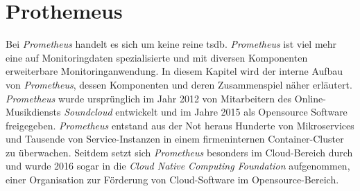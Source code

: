 \documentclass[titlepage]{report}
\begin{document}
\section*{Prothemeus}
Bei \emph{Prometheus} handelt es sich um keine reine \gls{tsdb}.
\emph{Prometheus} ist viel mehr eine auf Monitoringdaten spezialisierte
und mit diversen Komponenten erweiterbare Monitoringanwendung. In diesem
Kapitel wird der interne Aufbau von \emph{Prometheus}, dessen
Komponenten und deren Zusammenspiel näher erläutert. \emph{Prometheus}
wurde ursprünglich im Jahr 2012 von Mitarbeitern des Online-Musikdiensts
\emph{Soundcloud} entwickelt\cite{PROMETHEUS_OVERVIEW} und im Jahre 2015
als Opensource Software freigegeben. \emph{Prometheus} entstand aus der
Not heraus Hunderte von Mikroservices und Tausende von Service\hyp{}Instanzen
in einem firmeninternen Container\hyp{}Cluster zu
überwachen\cite{PROMETHEUS_YOUTUBE}. Seitdem setzt sich
\emph{Prometheus} besonders im Cloud\hyp{}Bereich durch und wurde 2016
sogar in die \emph{Cloud Native Computing Foundation}
aufgenommen\cite{CNCF}, einer Organisation zur Förderung von
Cloud\hyp{}Software im Opensource\hyp{}Bereich.
\end{document}
